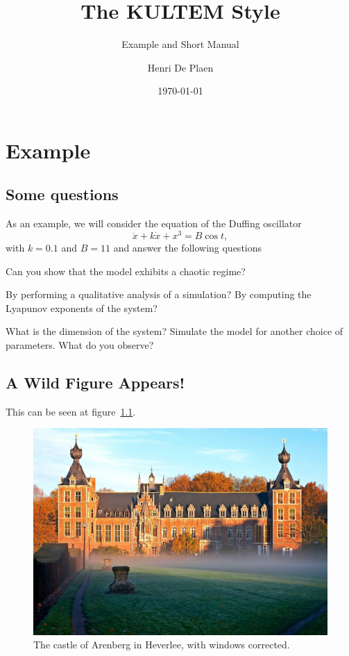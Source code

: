 \documentclass[oneside,a4paper,11pt,explicit]{book}
\title{The KULTEM Style}
\subtitle{Example and Short Manual}
\date{\today}
\author{Henri De Plaen}
\begin{document}
\maketitle

\chapter{Example}
\lipsum[1]

\section{Some questions}
\lipsum[2]

As an example, we will consider the equation of the Duffing oscillator
\begin{equation}
\ddot{x}+k\dot{x}+x^3=B\cos t,
\end{equation}
with $k=0.1$ and $B=11$ and answer the following questions

\begin{questions}
\question Can you show that the model exhibits a chaotic regime?
\begin{tasks}
\task By performing a qualitative analysis of a simulation?
\task By computing the Lyapunov exponents of the system?
\end{tasks}
\question What is the dimension of the system?
\question Simulate the model for another choice of parameters. What do you observe?
\end{questions}

\section{A Wild Figure Appears!}
\lipsum[3] This can be seen at figure~\ref{fig:example}.

\begin{figure}[h]
    \centering
    \includegraphics[width=\textwidth]{./arenberg.jpg}
    \caption{The castle of Arenberg in Heverlee, with windows corrected.}
    \label{fig:example}
\end{figure}
\end{document}

